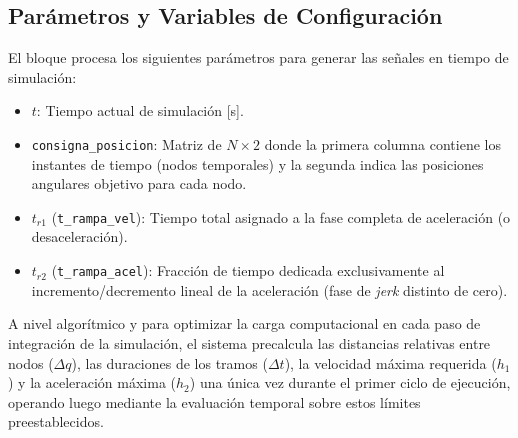 \documentclass[12pt, a4paper,journal, onecolumn, compsoc]{IEEEtran}
\begin{document}
\begin{appendices}
\subsection{Parámetros y Variables de Configuración}
El bloque procesa los siguientes parámetros para generar las señales en tiempo de simulación:
\begin{itemize}
    \item $t$: Tiempo actual de simulación [s].
    \item \texttt{consigna\_posicion}: Matriz de $N \times 2$ donde la primera columna contiene los instantes de tiempo (nodos temporales) y la segunda indica las posiciones angulares objetivo para cada nodo.
    \item $t_{r1}$ (\texttt{t\_rampa\_vel}): Tiempo total asignado a la fase completa de aceleración (o desaceleración).
    \item $t_{r2}$ (\texttt{t\_rampa\_acel}): Fracción de tiempo dedicada exclusivamente al incremento/decremento lineal de la aceleración (fase de \textit{jerk} distinto de cero).
\end{itemize}

A nivel algorítmico y para optimizar la carga computacional en cada paso de integración de la simulación, el sistema precalcula las distancias relativas entre nodos ($\Delta q$), las duraciones de los tramos ($\Delta t$), la velocidad máxima requerida ($h_1$) y la aceleración máxima ($h_2$) una única vez durante el primer ciclo de ejecución, operando luego mediante la evaluación temporal sobre estos límites preestablecidos.
\label{anexo:gen_trayectorias}
\end{appendices}
\end{document}
